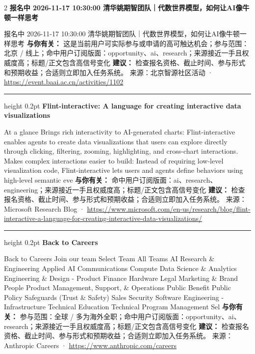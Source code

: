 \documentclass[10.5pt]{ctexart}
\begin{document}
\begin{multicols}{2}
{\large\bfseries 报名中 2026-11-17 10:30:00 清华姚期智团队｜代数世界模型，如何让AI像牛顿一样思考}\par
报名中 2026-11-17 10:30:00 清华姚期智团队｜代数世界模型，如何让AI像牛顿一样思考
\textbf{与你有关：} 这是当前用户可实际参与或申请的高可触达机会；参与范围：北京 / 线上；命中用户订阅版面：opportunity、ai、research；来源接近一手且权威度高；标题/正文包含高信号变化
\textbf{建议：} 检查报名资格、截止时间、参与形式和预期收益；合适则立即加入任务系统。
{\footnotesize\color{ormuted} 来源：北京智源社区活动 · \url{https://event.baai.ac.cn/activities/1102}}
\vspace{2mm}
\hrule height 0.2pt
\vspace{2mm}
{\large\bfseries Flint-interactive: A language for creating interactive data visualizations}\par
At a glance Brings rich interactivity to AI-generated charts: Flint-interactive enables agents to create data visualizations that users can explore directly through clicking, filtering, zooming, highlighting, and cross-chart interactions. Makes complex interactions easier to build: Instead of requiring low-level visualization code, Flint-interactive lets users and agents define behaviors using high-level semantic eve
\textbf{与你有关：} 命中用户订阅版面：ai、research、engineering；来源接近一手且权威度高；标题/正文包含高信号变化
\textbf{建议：} 检查报名资格、截止时间、参与形式和预期收益；合适则立即加入任务系统。
{\footnotesize\color{ormuted} 来源：Microsoft Research Blog · \url{https://www.microsoft.com/en-us/research/blog/flint-interactive-a-language-for-creating-interactive-data-visualizations/}}
\vspace{2mm}
\hrule height 0.2pt
\vspace{2mm}
{\large\bfseries Back to Careers}\par
Back to Careers Join our team Select Team All Teams AI Research \& Engineering Applied AI Communications Compute Data Science \& Analytics Engineering \& Design - Product Finance Hardware Legal Marketing \& Brand People Product Management, Support, \& Operations Public Benefit Public Policy Safeguards (Trust \& Safety) Sales Security Software Engineering - Infrastructure Technical Education Technical Program Management Sel
\textbf{与你有关：} 参与范围：全球 / 多为海外全职；命中用户订阅版面：opportunity、ai、research；来源接近一手且权威度高；标题/正文包含高信号变化
\textbf{建议：} 检查报名资格、截止时间、参与形式和预期收益；合适则立即加入任务系统。
{\footnotesize\color{ormuted} 来源：Anthropic Careers · \url{https://www.anthropic.com/careers}}

\end{multicols}
\end{document}
